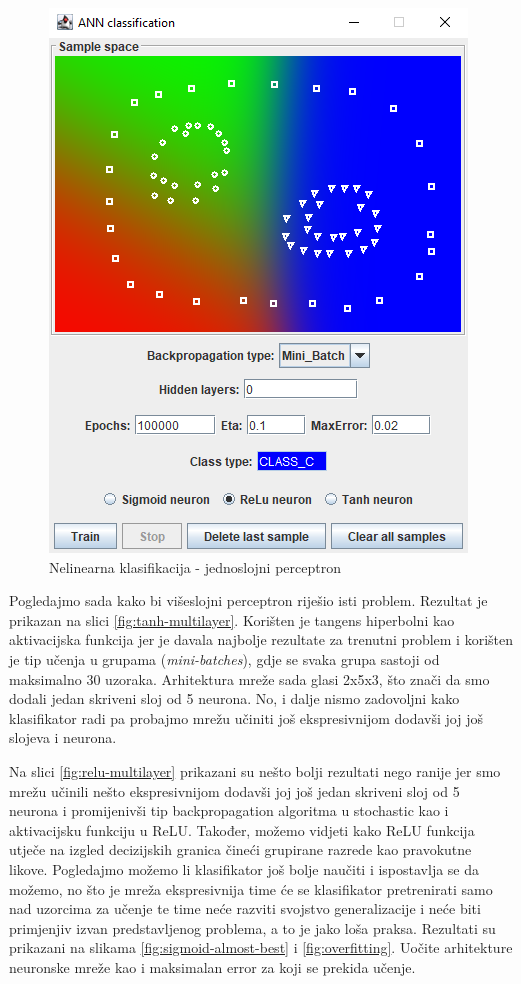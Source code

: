 \documentclass[times, utf8, zavrsni]{fer}
\begin{document}
\begin{figure}[H]
    \centering
    \includegraphics[scale=0.6]{img/single-layer-fail.png}
    \caption[Caption for LOF]{Nelinearna klasifikacija - jednoslojni perceptron}
    \label{fig:single-layer-fail}
\end{figure}

Pogledajmo sada kako bi višeslojni perceptron riješio isti problem. Rezultat je prikazan na slici \ref{fig:tanh-multilayer}. Korišten je tangens hiperbolni kao aktivacijska funkcija jer je davala najbolje rezultate za trenutni problem i korišten je tip učenja u grupama (\textit{mini-batches}), gdje se svaka grupa sastoji od maksimalno 30 uzoraka. Arhitektura mreže sada glasi 2x5x3, što znači da smo dodali jedan skriveni sloj od 5 neurona. No, i dalje nismo zadovoljni kako klasifikator radi pa probajmo mrežu učiniti još ekspresivnijom dodavši joj još slojeva i neurona.

Na slici \ref{fig:relu-multilayer} prikazani su nešto bolji rezultati nego ranije jer smo mrežu učinili nešto ekspresivnijom dodavši joj još jedan skriveni sloj od 5 neurona i promijenivši tip backpropagation algoritma u stochastic kao i aktivacijsku funkciju u ReLU. Također, možemo vidjeti kako ReLU funkcija utječe na izgled decizijskih granica čineći grupirane razrede kao pravokutne likove. Pogledajmo možemo li klasifikator još bolje naučiti i ispostavlja se da možemo, no što je mreža ekspresivnija time će se klasifikator pretrenirati samo nad uzorcima za učenje te time neće razviti svojstvo generalizacije i neće biti primjenjiv izvan predstavljenog problema, a to je jako loša praksa. Rezultati su prikazani na slikama \ref{fig:sigmoid-almost-best} i \ref{fig:overfitting}. Uočite arhitekture neuronske mreže kao i maksimalan error za koji se prekida učenje.
\end{document}
